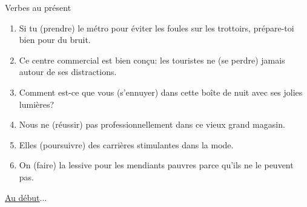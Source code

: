 \begin{frame}{Verbes au présent}
  \begin{enumerate}
    \item Si tu \underline{} (prendre) le métro pour éviter les foules sur les trottoirs, prépare-toi bien pour du bruit.
    \item Ce centre commercial est bien conçu: les touristes ne \underline{} (se perdre) jamais autour de ses distractions.
    \item Comment est-ce que vous \underline{} (s'ennuyer) dans cette boîte de nuit avec ses jolies lumières?
    \item Nous ne \underline{} (réussir) pas professionnellement dans ce vieux grand magasin.
    \item Elles \underline{} (poursuivre) des carrières stimulantes dans la mode.
    \item On \underline{} (faire) la lessive pour les mendiants pauvres parce qu'ils ne le peuvent pas.
  \end{enumerate}
  \vspace{0.25cm}
  \raggedleft\raggedleft\hyperlink{début}{Au début}...
\end{frame}